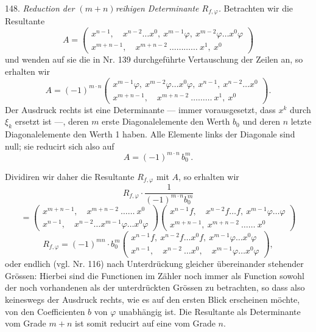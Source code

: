 148. \textit{Reduction der $(m+n)$reihigen Determinante $R_{f,\varphi}$.}
Betrachten wir die Resultante
\[
A = \left(\begin{array}{l}
x^{n-1},\quad x^{n-2}\ldots x^0,\ x^{m-1}\varphi,\ x^{m-2}\varphi\ldots x^0\varphi\\[2pt]
x^{m+n-1},\quad x^{m+n-2}\ \ldots\ldots\ldots\ldots\ x^1,\ x^0
\end{array}\right)
\]
und wenden auf sie die in Nr. 139 durchgef\"uhrte Vertauschung der
Zeilen an, so erhalten wir
\[
A = (-1)^{m\cdot n}\left(\begin{array}{l}
x^{m-1}\varphi,\ x^{m-2}\varphi\ldots x^0\varphi,\ x^{n-1},\ x^{n-2}\ldots x^0\\[2pt]
x^{m+n-1},\quad x^{m+n-2}\ \ldots\ldots\ldots\ x^1,\ x^0
\end{array}\right).
\]
Der Ausdruck rechts ist eine Determinante --- immer vorausgesetzt, dass
$x^k$ durch $\xi_k$ ersetzt ist ---, deren $m$ erste Diagonalelemente
den Werth $b_0$ und deren $n$ letzte Diagonalelemente den Werth 1
haben. Alle Elemente links der Diagonale sind null; sie reducirt sich
also auf
\[
A = (-1)^{m\cdot n}\,b_0^m.
\]


Dividiren wir daher die Resultante $R_{f,\varphi}$ mit $A$, so erhalten
wir
\[
R_{f,\varphi}\cdot\frac{1}{(-1)^{m\cdot n}b_0^m}
\]
\[
= \left(\begin{array}{l}
x^{m+n-1},\quad x^{m+n-2}\ \ldots\ldots\ x^0\\[2pt]
x^{n-1},\quad x^{n-2}\ldots x^{m-1}\varphi\ldots x^0\varphi
\end{array}\right)
\left(\begin{array}{l}
x^{n-1}f,\quad x^{n-2}f\ldots f,\ x^{m-1}\varphi\ldots\varphi\\[2pt]
x^{m+n-1},\ x^{m+n-2}\ \ldots\ldots\ x^0
\end{array}\right)
\]
\[
R_{f,\varphi} = (-1)^{mn}\cdot b_0^m\left(\begin{array}{l}
x^{n-1}f,\ x^{n-2}f\ldots x^0f,\ x^{m-1}\varphi\ldots x^0\varphi\\[2pt]
x^{n-1},\quad x^{n-2}\ \ldots x^0,\quad x^{m-1}\varphi\ldots x^0\varphi
\end{array}\right),
\]
oder endlich (vgl. Nr. 116) nach Unterdr\"uckung gleicher
\"ubereinander stehender Gr\"ossen:
Hierbei sind die Functionen im Z\"ahler noch immer als Function sowohl
der noch vorhandenen als der unterdr\"uckten Gr\"ossen zu betrachten,
so dass also keineswegs der Ausdruck rechts, wie es auf den ersten
Blick erscheinen m\"ochte, von den Coefficienten $b$ von $\varphi$
unabh\"angig ist. Die Resultante als Determinante vom Grade $m+n$ ist
somit reducirt auf eine vom Grade $n$.

